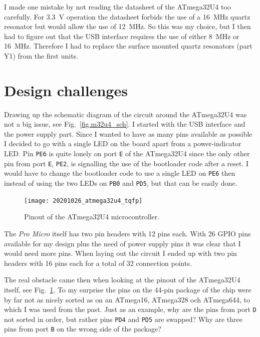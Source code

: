 \begin{multicols}{2}
I made one mistake by not reading the datasheet of the ATmega32U4 too carefully. For \SI{3.3}{\volt} operation
the datasheet forbids the use of a \SI{16}{\mega\hertz} quartz resonator but would allow the use
of \SI{12}{\mega\hertz}. So this was my choice, but I then had to figure out that the USB
interface requires the use of either \SI{8}{\mega\hertz} or \SI{16}{\mega\hertz}. Therefore I had to
replace the surface mounted quartz resonators (part Y1) from the first units.

\section{Design challenges}
Drawing up the schematic diagram of the circuit around the ATmega32U4 was not a big
issue, see Fig.~\ref{fig.m32u4_sch}. I started with the USB interface and the power supply part. Since I wanted to
have as many pins available as possible I decided to go with a single LED on the board
apart from a power-indicator LED. Pin \lstinline!PE6! is quite lonely on port \lstinline!E! of the ATmega32U4 since
the only other pin from port \lstinline!E!, \lstinline!PE2!, is signalling the use of the bootloader code after a reset.
I would have to change the bootloader code to use a single LED on \lstinline!PE6! then instead of using the
two LEDs on \lstinline!PB0! and \lstinline!PD5!, but that can be easily done.

\begin{figure}[H]
  \centering
  \texttt{[image: 20201026\_atmega32u4\_tqfp]}
  \caption{Pinout of the ATmega32U4 microcontroller.}\label{fig.m32u4_chip}
\end{figure}

The \emph{Pro Micro} itself has two pin headers with 12 pins each. With 26 GPIO pins available
for my design plus the need of power supply pins it was clear that I would need more pins.
When laying out the circuit I ended up with two pin headers with 16 pins each for a total
of 32 connection points.

The real obstacle came then when looking at the pinout of the ATmega32U4 itself, see Fig.~\ref{fig.m32u4_chip}.
To my surprise
the pins on the 44-pin package of the chip were by far not as nicely sorted as
on an ATmega16, ATmega328 och ATmega644, to which I was used from the past. Just as an example,
why are the pins from port \lstinline!D! not sorted in order, but rather pins \lstinline!PD4! and \lstinline!PD5!
 are swapped? Why are
three pins from port \lstinline!B! on the wrong side of the package?


\end{multicols}
